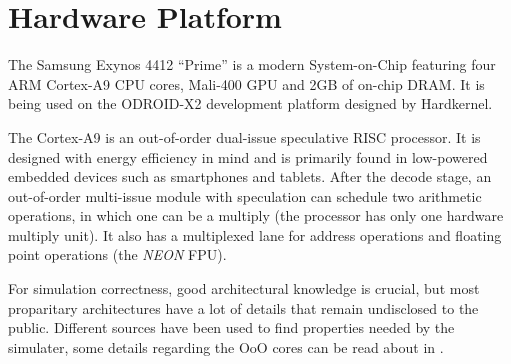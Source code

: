 \section{Hardware Platform}

The Samsung Exynos 4412 ``Prime'' is a modern System-on-Chip featuring four ARM
Cortex-A9 CPU cores, Mali-400 GPU and 2GB of on-chip DRAM. It is being used on
the ODROID-X2 development platform designed by Hardkernel.

The Cortex-A9 is an out-of-order dual-issue speculative RISC processor. It is
designed with energy efficiency in mind and is primarily found in low-powered
embedded devices such as smartphones and tablets. After the decode stage, an
out-of-order multi-issue module with speculation can schedule two arithmetic
operations, in which one can be a multiply (the processor has only one hardware
multiply unit). It also has a multiplexed lane for address operations and
floating point operations (the \emph{NEON} FPU).

For simulation correctness, good architectural knowledge is crucial, but most
proparitary architectures have a lot of details that remain undisclosed to the
public. Different sources have been used to find properties needed by the simulater,
some details regarding the OoO cores can be read about in \cite{blem2013detailed}.
